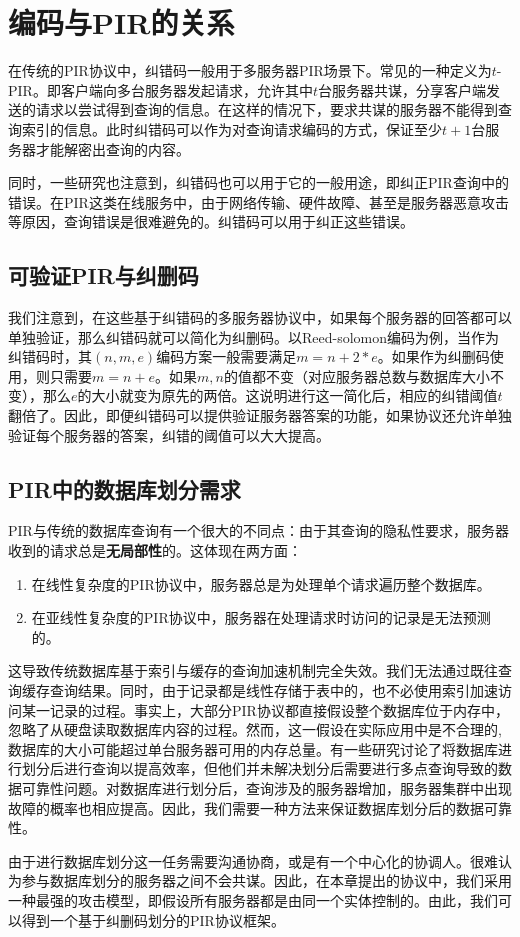 \section{编码与PIR的关系}
在传统的PIR协议中，纠错码一般用于多服务器PIR场景下。常见的一种定义为$t$-PIR。即客户端向多台服务器发起请求，允许其中$t$台服务器共谋，分享客户端发送的请求以尝试得到查询的信息。在这样的情况下，要求共谋的服务器不能得到查询索引的信息。此时纠错码可以作为对查询请求编码的方式，保证至少$t+1$台服务器才能解密出查询的内容。

同时，一些研究\cite{10.1007/978-3-031-22368-6_3}也注意到，纠错码也可以用于它的一般用途，即纠正PIR查询中的错误。在PIR这类在线服务中，由于网络传输、硬件故障、甚至是服务器恶意攻击等原因，查询错误是很难避免的。纠错码可以用于纠正这些错误。

\subsection{可验证PIR与纠删码}

我们注意到，在这些基于纠错码的多服务器协议中，如果每个服务器的回答都可以单独验证，那么纠错码就可以简化为纠删码。以Reed-solomon编码为例，当作为纠错码时，其$(n,m,e)$编码方案一般需要满足$m=n+2*e$。如果作为纠删码使用，则只需要$m=n+e$。如果$m,n$的值都不变（对应服务器总数与数据库大小不变），那么$e$的大小就变为原先的两倍。这说明进行这一简化后，相应的纠错阈值$t$翻倍了。因此，即便纠错码可以提供验证服务器答案的功能，如果协议还允许单独验证每个服务器的答案，纠错的阈值可以大大提高。

\subsection{PIR中的数据库划分需求}
PIR与传统的数据库查询有一个很大的不同点：由于其查询的隐私性要求，服务器收到的请求总是\textbf{无局部性}的。这体现在两方面：
\begin{enumerate}
    \item 在线性复杂度的PIR协议中，服务器总是为处理单个请求遍历整个数据库。
    \item 在亚线性复杂度的PIR协议中，服务器在处理请求时访问的记录是无法预测的。
\end{enumerate}

这导致传统数据库基于索引与缓存的查询加速机制完全失效。我们无法通过既往查询缓存查询结果。同时，由于记录都是线性存储于表中的，也不必使用索引加速访问某一记录的过程。事实上，大部分PIR协议都直接假设整个数据库位于内存中，忽略了从硬盘读取数据库内容的过程。然而，这一假设在实际应用中是不合理的,数据库的大小可能超过单台服务器可用的内存总量。有一些研究讨论了将数据库进行划分后进行查询\cite{RAID-PIR}以提高效率，但他们并未解决划分后需要进行多点查询导致的数据可靠性问题。对数据库进行划分后，查询涉及的服务器增加，服务器集群中出现故障的概率也相应提高。因此，我们需要一种方法来保证数据库划分后的数据可靠性。

由于进行数据库划分这一任务需要沟通协商，或是有一个中心化的协调人。很难认为参与数据库划分的服务器之间不会共谋。因此，在本章提出的协议中，我们采用一种最强的攻击模型，即假设所有服务器都是由同一个实体控制的。由此，我们可以得到一个基于纠删码划分的PIR协议框架。
